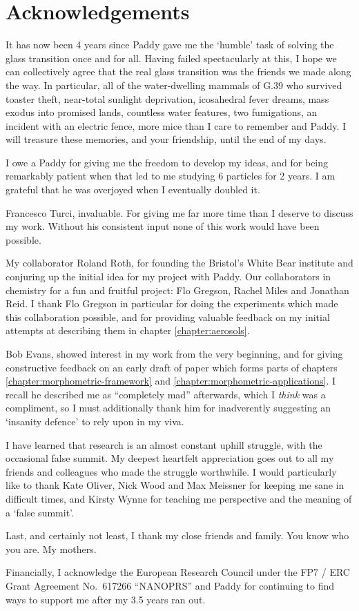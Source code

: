 
\chapter*{Acknowledgements}

It has now been 4 years since Paddy gave me the `humble' task of solving the glass transition once and for all.
Having failed spectacularly at this, I hope we can collectively agree that the real glass transition was the friends we made along the way.
In particular, all of the water-dwelling mammals of G.39 who survived toaster theft, near-total sunlight deprivation, icosahedral fever dreams, mass exodus into promised lands, countless water features, two fumigations, an incident with an electric fence, more mice than I care to remember and Paddy.
I will treasure these memories, and your friendship, until the end of my days.

I owe a  Paddy for giving me the freedom to develop my ideas, and for being remarkably patient when that led to me studying 6 particles for 2 years.
I am grateful that he was overjoyed when I eventually doubled it.

Francesco Turci, invaluable.
For giving me far more time than I deserve to discuss my work.
Without his consistent input none of this work would have been possible.

My collaborator Roland Roth, for founding the Bristol's White Bear institute and conjuring up the initial idea for my project with Paddy.
Our collaborators in chemistry for a fun and fruitful project: Flo Gregson, Rachel Miles and Jonathan Reid.
I thank Flo Gregson in particular for doing the experiments which made this collaboration possible, and for providing valuable feedback on my initial attempts at describing them in chapter \ref{chapter:aerosols}.

Bob Evans, showed interest in my work from the very beginning, and for giving constructive feedback on an early draft of paper which forms parts of chapters \ref{chapter:morphometric-framework} and \ref{chapter:morphometric-applications}.
I recall he described me as ``completely mad'' afterwards, which I \emph{think} was a compliment, so I must additionally thank him for inadverently suggesting an `insanity defence' to rely upon in my viva.

I have learned that research is an almost constant uphill struggle, with the occasional false summit.
My deepest heartfelt appreciation goes out to all my friends and colleagues who made the struggle worthwhile.
I would particularly like to thank Kate Oliver, Nick Wood and Max Meissner for keeping me sane in difficult times, and Kirsty Wynne for teaching me perspective and the meaning of a `false summit'.

Last, and certainly not least, I thank my close friends and family.
You know who you are.
My mothers.

Financially, I acknowledge the European Research Council under the FP7 / ERC Grant Agreement No.\ 617266 ``NANOPRS'' and Paddy for continuing to find ways to support me after my 3.5 years ran out.


